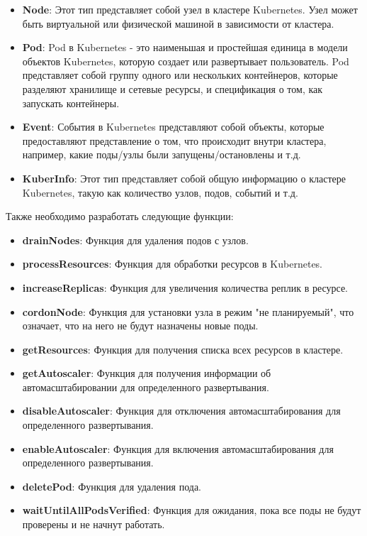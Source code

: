 \begin{itemize}
\item \textbf{Node}: Этот тип представляет собой узел в кластере Kubernetes.
Узел может быть виртуальной или физической машиной в зависимости от кластера.
\item \textbf{Pod}: Pod в Kubernetes - это наименьшая и простейшая единица в
модели объектов Kubernetes, которую создает или развертывает пользователь. Pod
представляет собой группу одного или нескольких контейнеров, которые разделяют
хранилище и сетевые ресурсы, и спецификация о том, как запускать контейнеры.
\item \textbf{Event}: События в Kubernetes представляют собой объекты, которые
предоставляют представление о том, что происходит внутри кластера, например,
какие поды/узлы были запущены/остановлены и т.д.
\item \textbf{KuberInfo}: Этот тип представляет собой общую информацию о
кластере Kubernetes, такую как количество узлов, подов, событий и т.д.
\end{itemize}

Также необходимо разработать следующие функции:

\begin{itemize}
\item \textbf{drainNodes}: Функция для удаления подов с узлов.
\item \textbf{processResources}: Функция для обработки ресурсов в Kubernetes.
\item \textbf{increaseReplicas}: Функция для увеличения количества реплик в
ресурсе.
\item \textbf{cordonNode}: Функция для установки узла в режим "не планируемый",
что означает, что на него не будут назначены новые поды.
\item \textbf{getResources}: Функция для получения списка всех ресурсов в
кластере.
\item \textbf{getAutoscaler}: Функция для получения информации об
автомасштабировании для определенного развертывания.
\item \textbf{disableAutoscaler}: Функция для отключения автомасштабирования для
определенного развертывания.
\item \textbf{enableAutoscaler}: Функция для включения автомасштабирования для
определенного развертывания.
\item \textbf{deletePod}: Функция для удаления пода.
\item \textbf{waitUntilAllPodsVerified}: Функция для ожидания, пока все поды не
будут проверены и не начнут работать.
\end{itemize}

